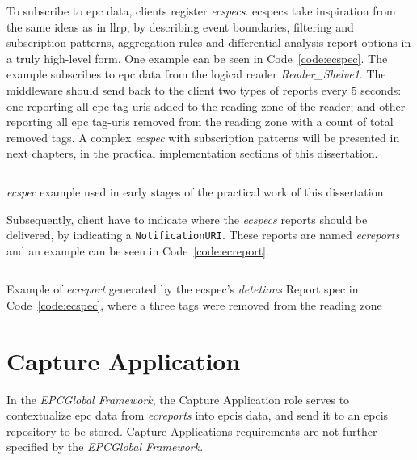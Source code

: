 To subscribe to \ac{epc} data, clients register \emph{\acp{ecspec}}. 
\acp{ecspec} take inspiration from the same ideas as in \ac{llrp}, by describing event boundaries, filtering and subscription patterns, aggregation rules and differential analysis report options in a truly high-level form.
One example can be seen in Code~\ref{code:ecspec}. The example subscribes to \ac{epc} data from the logical reader \textit{Reader\_Shelve1}. The middleware should send back to the client two types of reports every $5$ seconds: one reporting all \ac{epc} tag-\acp{uri} added to the reading zone of the reader; and other reporting all \ac{epc} tag-\acp{uri} removed from the reading zone with a count of total removed tags.
A complex \emph{\ac{ecspec}} with subscription patterns will be presented in next chapters, in the practical implementation sections of this dissertation.

\begin{listing}
    \inputminted[linenos, breaklines]{xml}{./code/sota/ECSpec.xml}
    \caption[\emph{\ac{ecspec}} example]{\emph{\ac{ecspec}} example used in early stages of the practical work of this dissertation}
    \label{code:ecspec}
\end{listing}

Subsequently, client have to indicate where the \emph{\acp{ecspec}} reports should be delivered, by indicating a \texttt{NotificationURI}.
These reports are named \emph{\acp{ecreport}} and an example can be seen in Code~\ref{code:ecreport}.

\begin{listing}
    \inputminted[linenos, breaklines]{xml}{./code/sota/EC_REPORT_deletions.xml}
    \caption[Example of \emph{\ac{ecreport}}]{Example of \emph{\ac{ecreport}} generated by the \ac{ecspec}'s \textit{detetions} Report \ac{spec} in Code~\ref{code:ecspec}, where a three tags were removed from the reading zone}
    \label{code:ecreport}
\end{listing}

\section{Capture Application}

In the \emph{EPCGlobal Framework}, the Capture Application role serves to contextualize \ac{epc} data from \emph{\acp{ecreport}} into \ac{epcis} data, and send it to an \ac{epcis} repository to be stored.
Capture Applications requirements are not further specified by the \emph{EPCGlobal Framework}.

